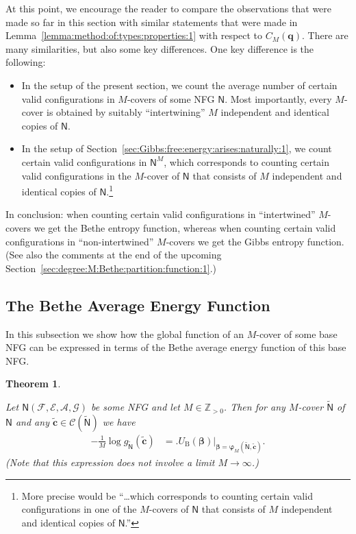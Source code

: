 \documentclass[journal, twocolumn]{IEEEtran}
\renewcommand{\mathbf}[1]{{\bm{#1}}}
\newcommand{\Z}{\mathbb{Z}}
\newcommand{\Zpp}{\Z_{>0}}
\newcommand{\vect}[1]{\mathbf{#1}}
\newcommand{\code}[1]{\mathcal{#1}}
\newcommand{\set}[1]{\mathcal{#1}}
\newcommand{\graph}[1]{\mathsf{#1}}
\newcommand{\codeCedge}{\code{C}}
\newcommand{\bel}{\beta}
\newcommand{\vbel}{\boldsymbol{\bel}}
\newcommand{\setA}{\set{A}}
\newcommand{\setE}{\set{E}}
\newcommand{\setF}{\set{F}}
\newcommand{\setG}{\set{G}}
\newcommand{\cvc}{\vect{\cover{c}}}
\newcommand{\vq}{\vect{q}}
\newcommand{\graphN}{\graph{N}}
\newcommand{\UBethe}{U_{\mathrm{B}}}
\newcommand{\cover}[1]{\tilde{#1}}
\newcommand{\cgraph}[1]{\cover{\graph{#1}}}
\newcommand{\?}{\mathrm{?}}
\newcommand{\varphiM}{\boldsymbol{\varphi}_{M}}
\newtheorem{Theorem}[Lemma]{Theorem}
\begin{document}
At this point, we encourage the reader to compare the observations that were
made so far in this section with similar statements that were made in
Lemma~\ref{lemma:method:of:types:properties:1} with respect to
$C_M(\vq)$. There are many similarities, but also some key differences. One
key difference is the following:
\begin{itemize}

\item In the setup of the present section, we count the average number of
  certain valid configurations in $M$-covers of some NFG $\graphN$. Most
  importantly, every $M$-cover is obtained by suitably ``intertwining'' $M$
  independent and identical copies of $\graphN$.

\item In the setup of Section~\ref{sec:Gibbs:free:energy:arises:naturally:1},
  we count certain valid configurations in $\graphN^M$, which corresponds to
  counting certain valid configurations in the $M$-cover of $\graphN$ that
  consists of $M$ independent and identical copies of $\graphN$.\footnote{More
    precise would be ``\ldots which corresponds to counting certain valid
    configurations in one of the $M$-covers of $\graphN$ that consists of $M$
    independent and identical copies of $\graphN$.''}

\end{itemize}
In conclusion: when counting certain valid configurations in ``intertwined''
$M$-covers we get the Bethe entropy function, whereas when counting certain
valid configurations in ``non-intertwined'' $M$-covers we get the Gibbs
entropy function. (See also the comments at the end of the upcoming
Section~\ref{sec:degree:M:Bethe:partition:function:1}.)


\subsection{The Bethe Average Energy Function}


In this subsection we show how the global function of an $M$-cover of some
base NFG can be expressed in terms of the Bethe average energy
function of this base NFG.


\begin{Theorem}
  \label{theorem:asymptotic:average:function:value:pre:images:in:graph:covers:1}

  Let $\graphN(\setF,\setE, \setA, \setG)$ be some NFG and let $M \in \Zpp$.
  Then for any $M$-cover $\cgraph{N}$ of $\graphN$ and any $\cvc \in
  \codeCedge(\cgraph{N})$ we have
  \begin{align*}
    -
    \frac{1}{M}
    \log 
      g_{\cgraph{N}}(\cvc)
      &= \Big.
          \UBethe(\vbel)
         \Big|_{\vbel = \varphiM(\cgraph{N},\cvc)}.
  \end{align*}
  (Note that this expression does not involve a limit $M \to \infty$.)
\end{Theorem}
\end{document}
